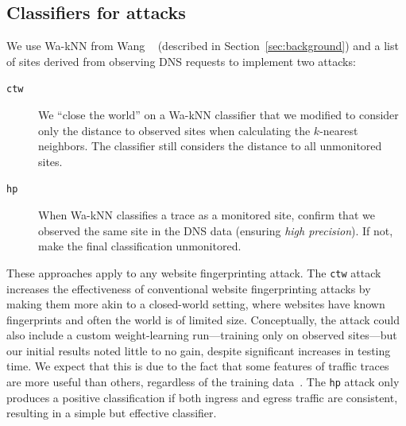 \subsection{Classifiers for \name attacks}

We use Wa-kNN from Wang \ea~\cite{Wang2014a} (described in
Section~\ref{sec:background}) and a list of sites derived from
observing DNS requests to implement two \name attacks:

\begin{description}
	\item[\texttt{ctw}] We ``close the world''
	on a Wa-kNN classifier that we modified to consider only the distance to
	observed sites when calculating the $k$-nearest neighbors.
	The classifier still considers the distance to all unmonitored sites.
	\item[\texttt{hp}] When Wa-kNN classifies a trace as a monitored site, confirm
	that we observed the same site in the DNS data (ensuring {\em high
	precision}). If not, make the final classification unmonitored.
\end{description}
\noindent
These approaches apply to any website fingerprinting attack. The
\texttt{ctw} attack increases the effectiveness of conventional website
fingerprinting attacks by making them more akin to a closed-world setting,
where websites have known fingerprints and often the world is of limited size.
Conceptually, the attack could also include
a custom weight-learning run---training only on observed sites---but our initial
results noted little to no gain, despite significant increases in
testing time.
We expect that this is due to the fact that some features of traffic traces are
more useful than others, regardless of the training data~\cite{Hayes2016a}.
The \texttt{hp} attack only produces a positive classification if both ingress
and egress traffic are consistent, resulting in a simple but effective
classifier.
